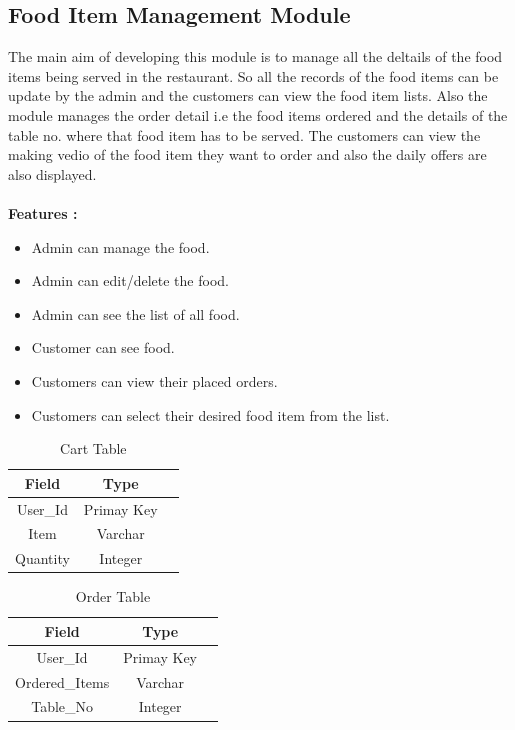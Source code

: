 \documentclass[12pt,a4paper]{report}
\begin{document}
\subsection{Food Item Management Module}
\hspace{0.25cm}
\par
The main aim of developing this module is to manage all the deltails of the food items being served in the restaurant. So all the records of the food items can be update by the admin and the customers can view the food item lists. Also the module manages the order detail i.e the food items ordered and the details of the table no. where that food item has to be served. The customers can view the making vedio of the food item they want to order and also the daily offers are also displayed.
\\
\\
\textbf{Features :}
\begin{itemize}
	\item Admin can manage the food.
	\item Admin can edit/delete the food.
	\item Admin can see the list of all food.
	\item Customer can see food.
	\item Customers can view their placed orders.
	\item Customers can select their desired food item from the list. 
\end{itemize}

\begin{table}
  \begin{center}
    \begin{tabular}{ |c|c|c| } 
    \hline
    Field & Type  \\
    \hline
    User\_Id & Primay Key \\
    \hline
    Item & Varchar \\
    \hline
    Quantity & Integer \\
    \hline
    \end{tabular}
    \caption{ Cart Table }
    \end{center}
  \end{table}

  \begin{table}
    \begin{center}
      \begin{tabular}{ |c|c|c| } 
      \hline
      Field & Type  \\
      \hline
      User\_Id & Primay Key \\
      \hline
      Ordered\_Items & Varchar \\
      \hline
      Table\_No & Integer \\
      \hline
      \end{tabular}
      \caption{ Order Table }
      \end{center}
    \end{table}
\end{document}
